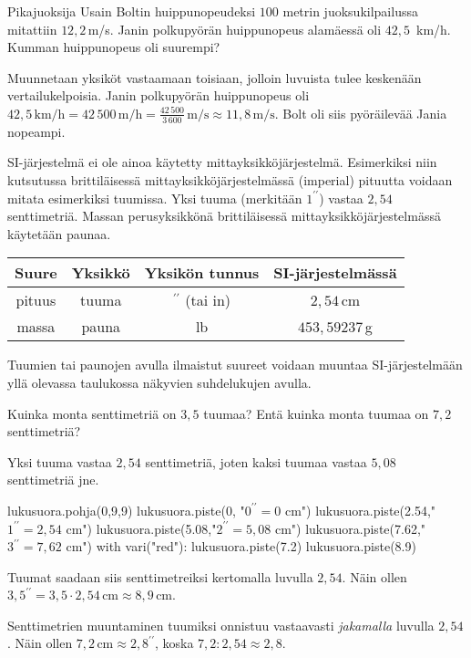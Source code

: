 \begin{esimerkki}
Pikajuoksija Usain Boltin huippunopeudeksi $100$ metrin juoksukilpailussa mitattiin $12,2$\,m/s. Janin polkupyörän huippunopeus alamäessä oli $42,5$\, km/h. Kumman huippunopeus oli suurempi?

\begin{esimratk}
Muunnetaan yksiköt vastaamaan toisiaan, jolloin luvuista tulee keskenään vertailukelpoisia. Janin polkupyörän huippunopeus oli $42,5\,\textrm{km/h} = 42\,500\,\textrm{m/h} = \frac{42\,500}{3\,600}\,\textrm{m/s} \approx 11,8\,\textrm{m/s}$. Bolt oli siis pyöräilevää Jania nopeampi.
\end{esimratk}
\end{esimerkki}

SI-järjestelmä ei ole ainoa käytetty mittayksikköjärjestelmä. Esimerkiksi niin kutsutussa brittiläisessä mittayksikköjärjestelmässä (imperial) pituutta voidaan mitata esimerkiksi tuumissa. Yksi tuuma (merkitään $1^{\prime \prime}$) vastaa $2,54$ senttimetriä. Massan perusyksikkönä brittiläisessä mittayksikköjärjestelmässä käytetään paunaa. %

\begin{tabular}{c|c|c|c}
Suure & Yksikkö & Yksikön tunnus & SI-järjestelmässä\\
\hline
pituus & tuuma & $^{\prime \prime}$ (tai in) & $2,54$\,cm \\
massa & pauna & lb & $453,59237$\,g \\
\end{tabular}

Tuumien tai paunojen avulla ilmaistut suureet voidaan muuntaa SI-järjestelmään yllä olevassa taulukossa näkyvien suhdelukujen avulla.

\begin{esimerkki}
Kuinka monta senttimetriä on $3,5$ tuumaa? Entä kuinka monta tuumaa on $7,2$ senttimetriä?

	\begin{esimratk}
Yksi tuuma vastaa $2,54$ senttimetriä, joten kaksi tuumaa vastaa $5,08$ senttimetriä jne.
	
\begin{kuva}
	lukusuora.pohja(0,9,9)
	lukusuora.piste(0, "$0^{\prime \prime} = 0 $ cm")
	lukusuora.piste(2.54,"$1^{\prime \prime} = 2,54$ cm")
	lukusuora.piste(5.08,"$2^{\prime \prime} = 5,08$ cm")
	lukusuora.piste(7.62,"$3^{\prime \prime} = 7,62$ cm")
	with vari("red"):
	  lukusuora.piste(7.2)
	  lukusuora.piste(8.9)
\end{kuva}

Tuumat saadaan siis senttimetreiksi kertomalla luvulla $2,54$. Näin ollen $3,5^{\prime \prime} = 3,5 \cdot 2,54\,\textrm{cm} \approx 8,9\,$cm.

Senttimetrien muuntaminen tuumiksi onnistuu vastaavasti \emph{jakamalla} luvulla $2,54$. Näin ollen $7,2\,\textrm{cm} \approx 2,8^{\prime \prime}$, koska $7,2:2,54 \approx 2,8$.
	\end{esimratk}
\end{esimerkki}

